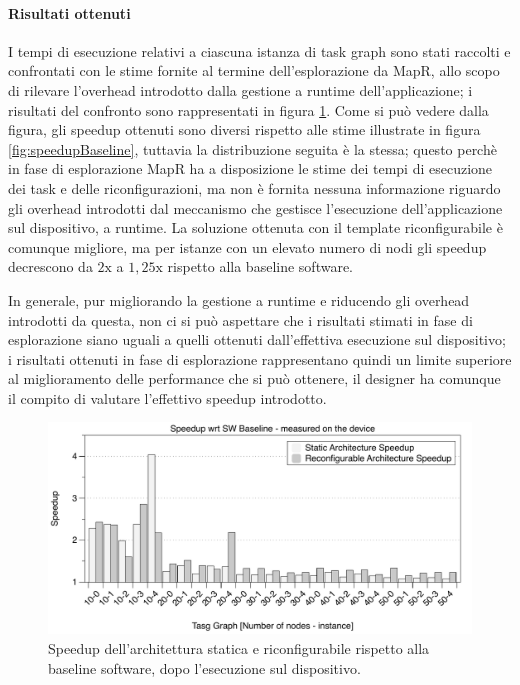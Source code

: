 \paragraph{Risultati ottenuti}
I tempi di esecuzione relativi a ciascuna istanza di task graph sono stati raccolti e confrontati
con le stime fornite al termine dell'esplorazione da MapR, allo scopo di rilevare l'overhead
introdotto dalla gestione a runtime dell'applicazione; i risultati del confronto sono
rappresentati in figura \ref{fig:speedupBaselineRuntime}.
Come si pu\`o vedere dalla figura, gli speedup ottenuti sono diversi rispetto alle stime
illustrate in figura \ref{fig:speedupBaseline}, tuttavia la distribuzione seguita \`e la stessa;
questo perch\`e in fase di esplorazione MapR ha a disposizione le stime dei tempi di esecuzione
dei task e delle riconfigurazioni, ma non \`e fornita nessuna informazione riguardo gli overhead
introdotti dal meccanismo che gestisce l'esecuzione dell'applicazione sul dispositivo, a runtime.
La soluzione ottenuta con il template riconfigurabile \`e comunque migliore, ma per istanze
con un elevato numero di nodi gli speedup decrescono da $2\text{x}$ a $1,25\text{x}$ rispetto alla
baseline software.

In generale, pur migliorando la gestione a runtime e riducendo gli overhead introdotti da questa,
non ci si pu\`o aspettare che i risultati stimati in fase di esplorazione siano uguali a quelli ottenuti
dall'effettiva esecuzione sul dispositivo; i risultati ottenuti in fase di esplorazione rappresentano quindi
un limite superiore al miglioramento delle performance che si pu\`o ottenere, il designer ha comunque il compito
di valutare l'effettivo speedup introdotto.

\begin{figure}[b]
 \begin{center}
  \includegraphics[width=\textwidth]{./capitoli/figure/cap6/FPL_Runtime.pdf}
  \caption{Speedup dell'architettura statica e riconfigurabile rispetto alla
  baseline software, dopo l'esecuzione sul dispositivo.}
  \label{fig:speedupBaselineRuntime}
 \end{center}
\end{figure}

